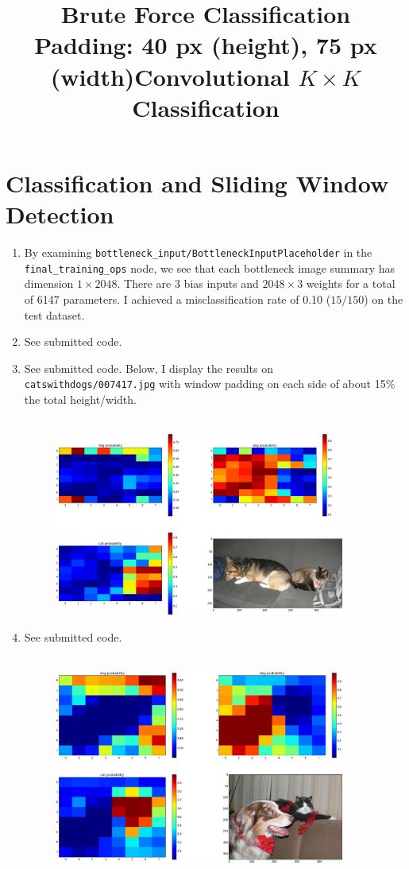 \documentclass[12pt]{article}
\begin{document}
\section{Classification and Sliding Window Detection}
\begin{enumerate}
	\item By examining \verb|bottleneck_input/BottleneckInputPlaceholder| in the \verb|final_training_ops| node, we see that each bottleneck image summary has dimension $1 \times 2048$. There are 3 bias inputs and $2048 \times 3$ weights for a total of 6147 parameters. I achieved a misclassification rate of 0.10 ($15 / 150$) on the test dataset.
	\item See submitted code.
	\item See submitted code. Below, I display the results on \verb|catswithdogs/007417.jpg| with window padding on each side of about 15\% the total height/width.
	\begin{figure}[H]
		\centering
		\title{\bf Brute Force Classification \\
			Padding: 40 px (height), 75 px (width)}
		\\ \vspace{5mm}
		\includegraphics[width=0.9\textwidth]{../Figures/hw2_4_iii_catswithdogs_007417.png}
	\end{figure}
	\item See submitted code.
	\begin{figure}[H]
		\centering
		\title{\bf Convolutional $K \times K$ Classification}
		\\ \vspace{5mm}
		\includegraphics[width=0.9\textwidth]{../Figures/hw2_4_iv_catswithdogs_006026.png}

\end{figure}
\end{enumerate}
\end{document}
